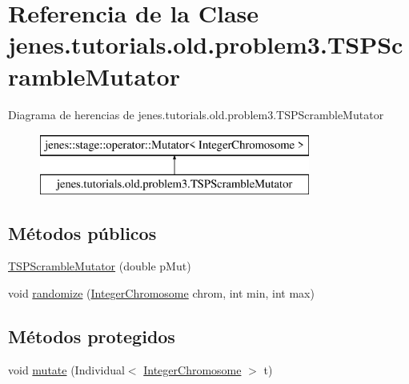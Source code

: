 \hypertarget{classjenes_1_1tutorials_1_1old_1_1problem3_1_1_t_s_p_scramble_mutator}{\section{Referencia de la Clase jenes.\-tutorials.\-old.\-problem3.\-T\-S\-P\-Scramble\-Mutator}
\label{classjenes_1_1tutorials_1_1old_1_1problem3_1_1_t_s_p_scramble_mutator}
}
Diagrama de herencias de jenes.\-tutorials.\-old.\-problem3.\-T\-S\-P\-Scramble\-Mutator\begin{figure}[H]
\begin{center}
\leavevmode
\includegraphics[height=2.000000cm]{classjenes_1_1tutorials_1_1old_1_1problem3_1_1_t_s_p_scramble_mutator}
\end{center}
\end{figure}
\subsection*{Métodos públicos}
\begin{DoxyCompactItemize}
\item 
\hyperlink{classjenes_1_1tutorials_1_1old_1_1problem3_1_1_t_s_p_scramble_mutator_aca9301f7d3b4b7d7f27e52f462734f49}{T\-S\-P\-Scramble\-Mutator} (double p\-Mut)
\item 
void \hyperlink{classjenes_1_1tutorials_1_1old_1_1problem3_1_1_t_s_p_scramble_mutator_aa32403f391bb9ddffb1145b4d852187d}{randomize} (\hyperlink{classjenes_1_1chromosome_1_1_integer_chromosome}{Integer\-Chromosome} chrom, int min, int max)
\end{DoxyCompactItemize}
\subsection*{Métodos protegidos}
\begin{DoxyCompactItemize}
\item 
void \hyperlink{classjenes_1_1tutorials_1_1old_1_1problem3_1_1_t_s_p_scramble_mutator_a7c2d7c9d8b465b19e0c4f8da57e299f3}{mutate} (Individual$<$ \hyperlink{classjenes_1_1chromosome_1_1_integer_chromosome}{Integer\-Chromosome} $>$ t)
\end{DoxyCompactItemize}



